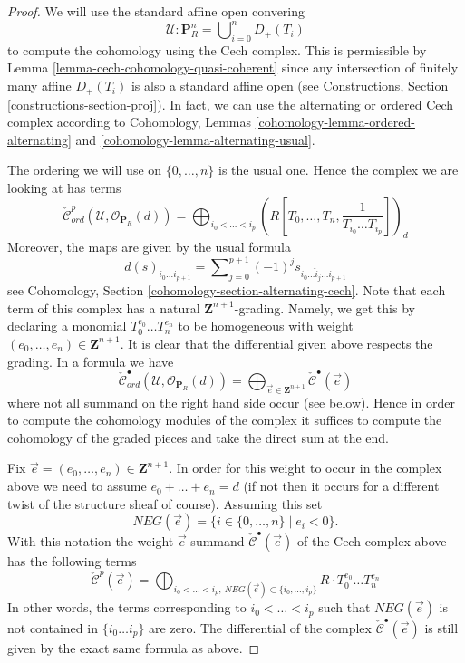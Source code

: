 \begin{proof}
We will use the standard affine open convering
$$
\mathcal{U} : \mathbf{P}^n_R = \bigcup\nolimits_{i = 0}^n D_{+}(T_i)
$$
to compute the cohomology using the Cech complex.
This is permissible by Lemma \ref{lemma-cech-cohomology-quasi-coherent}
since any intersection of finitely many affine $D_{+}(T_i)$ is also a
standard affine open (see
Constructions, Section \ref{constructions-section-proj}).
In fact, we can use the alternating or ordered Cech complex according to
Cohomology, Lemmas \ref{cohomology-lemma-ordered-alternating} and
\ref{cohomology-lemma-alternating-usual}.

\medskip\noindent
The ordering we will use on $\{0, \ldots, n\}$ is the usual one.
Hence the complex we are looking at has terms
$$
\check{\mathcal{C}}_{ord}^p(\mathcal{U}, \mathcal{O}_{\mathbf{P}_R}(d))
=
\bigoplus\nolimits_{i_0 < \ldots < i_p}
(R[T_0, \ldots, T_n, \frac{1}{T_{i_0} \ldots T_{i_p}}])_d
$$
Moreover, the maps are given by the usual formula
$$
d(s)_{i_0 \ldots i_{p + 1}} =
\sum\nolimits_{j = 0}^{p + 1} (-1)^j s_{i_0 \ldots \hat i_j \ldots i_{p + 1}}
$$
see Cohomology, Section \ref{cohomology-section-alternating-cech}.
Note that each term of this complex has a natural
$\mathbf{Z}^{n + 1}$-grading. Namely, we get this by declaring a monomial
$T_0^{e_0} \ldots T_n^{e_n}$ to be homogeneous with weight
$(e_0, \ldots, e_n) \in \mathbf{Z}^{n + 1}$. It is clear that the differential
given above respects the grading. In a formula we have
$$
\check{\mathcal{C}}_{ord}^\bullet(\mathcal{U}, \mathcal{O}_{\mathbf{P}_R}(d))
=
\bigoplus\nolimits_{\vec{e} \in \mathbf{Z}^{n + 1}}
\check{\mathcal{C}}^\bullet(\vec{e})
$$
where not all summand on the right hand side occur (see below).
Hence in order to compute the cohomology
modules of the complex it suffices to compute the cohomology of the graded
pieces and take the direct sum at the end.

\medskip\noindent
Fix $\vec{e} = (e_0, \ldots, e_n) \in \mathbf{Z}^{n + 1}$. In order for this
weight to occur in the complex above we need to assume
$e_0 + \ldots + e_n = d$ (if not then it occurs for a different twist of
the structure sheaf of course). Assuming this set
$$
NEG(\vec{e}) = \{i \in \{0, \ldots, n\} \mid e_i < 0\}.
$$
With this notation the weight $\vec{e}$ summand
$\check{\mathcal{C}}^\bullet(\vec{e})$ of the Cech complex above has
the following terms
$$
\check{\mathcal{C}}^p(\vec{e})
=
\bigoplus\nolimits_{i_0 < \ldots < i_p,
\ NEG(\vec{e}) \subset \{i_0, \ldots, i_p\}}
R \cdot T_0^{e_0} \ldots T_n^{e_n}
$$
In other words, the terms corresponding to $i_0 < \ldots < i_p$ such
that $NEG(\vec{e})$ is not contained in $\{i_0 \ldots i_p\}$ are zero.
The differential of the complex $\check{\mathcal{C}}^\bullet(\vec{e})$
is still given by the exact same formula as above.


\end{proof}
